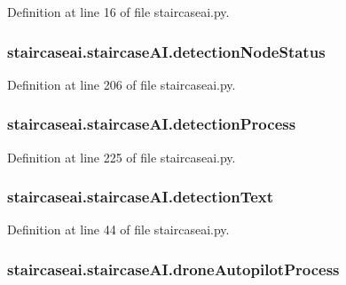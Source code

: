 Definition at line 16 of file staircaseai.\-py.

\hypertarget{classstaircaseai_1_1staircaseAI_ad3fdf6d0b4f17644da041f09e15b3ca7}{
\subsubsection[{detection\-Node\-Status}]{\setlength{\rightskip}{0pt plus 5cm}staircaseai.\-staircase\-A\-I.\-detection\-Node\-Status}}\label{classstaircaseai_1_1staircaseAI_ad3fdf6d0b4f17644da041f09e15b3ca7}


Definition at line 206 of file staircaseai.\-py.

\hypertarget{classstaircaseai_1_1staircaseAI_a87462cc129cb86ab0aaef5b8731cba6c}{
\subsubsection[{detection\-Process}]{\setlength{\rightskip}{0pt plus 5cm}staircaseai.\-staircase\-A\-I.\-detection\-Process}}\label{classstaircaseai_1_1staircaseAI_a87462cc129cb86ab0aaef5b8731cba6c}


Definition at line 225 of file staircaseai.\-py.

\hypertarget{classstaircaseai_1_1staircaseAI_a69f3626f7e9a387ecf066fc874fb9b15}{
\subsubsection[{detection\-Text}]{\setlength{\rightskip}{0pt plus 5cm}staircaseai.\-staircase\-A\-I.\-detection\-Text}}\label{classstaircaseai_1_1staircaseAI_a69f3626f7e9a387ecf066fc874fb9b15}


Definition at line 44 of file staircaseai.\-py.

\hypertarget{classstaircaseai_1_1staircaseAI_a40cdd3e980ae70333a716ceb08dde2bf}{
\subsubsection[{drone\-Autopilot\-Process}]{\setlength{\rightskip}{0pt plus 5cm}staircaseai.\-staircase\-A\-I.\-drone\-Autopilot\-Process}}\label{classstaircaseai_1_1staircaseAI_a40cdd3e980ae70333a716ceb08dde2bf}


